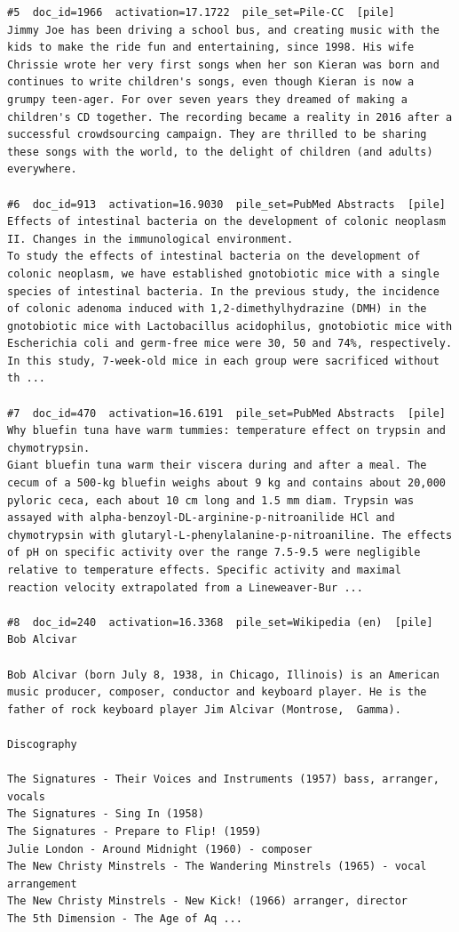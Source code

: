 \begin{verbatim}
#5  doc_id=1966  activation=17.1722  pile_set=Pile-CC  [pile]
Jimmy Joe has been driving a school bus, and creating music with the kids to make the ride fun and entertaining, since 1998. His wife Chrissie wrote her very first songs when her son Kieran was born and continues to write children's songs, even though Kieran is now a grumpy teen-ager. For over seven years they dreamed of making a children's CD together. The recording became a reality in 2016 after a successful crowdsourcing campaign. They are thrilled to be sharing these songs with the world, to the delight of children (and adults) everywhere.

#6  doc_id=913  activation=16.9030  pile_set=PubMed Abstracts  [pile]
Effects of intestinal bacteria on the development of colonic neoplasm II. Changes in the immunological environment.
To study the effects of intestinal bacteria on the development of colonic neoplasm, we have established gnotobiotic mice with a single species of intestinal bacteria. In the previous study, the incidence of colonic adenoma induced with 1,2-dimethylhydrazine (DMH) in the gnotobiotic mice with Lactobacillus acidophilus, gnotobiotic mice with Escherichia coli and germ-free mice were 30, 50 and 74%, respectively. In this study, 7-week-old mice in each group were sacrificed without th ...

#7  doc_id=470  activation=16.6191  pile_set=PubMed Abstracts  [pile]
Why bluefin tuna have warm tummies: temperature effect on trypsin and chymotrypsin.
Giant bluefin tuna warm their viscera during and after a meal. The cecum of a 500-kg bluefin weighs about 9 kg and contains about 20,000 pyloric ceca, each about 10 cm long and 1.5 mm diam. Trypsin was assayed with alpha-benzoyl-DL-arginine-p-nitroanilide HCl and chymotrypsin with glutaryl-L-phenylalanine-p-nitroaniline. The effects of pH on specific activity over the range 7.5-9.5 were negligible relative to temperature effects. Specific activity and maximal reaction velocity extrapolated from a Lineweaver-Bur ...

#8  doc_id=240  activation=16.3368  pile_set=Wikipedia (en)  [pile]
Bob Alcivar

Bob Alcivar (born July 8, 1938, in Chicago, Illinois) is an American music producer, composer, conductor and keyboard player. He is the father of rock keyboard player Jim Alcivar (Montrose,  Gamma).

Discography

The Signatures - Their Voices and Instruments (1957) bass, arranger, vocals
The Signatures - Sing In (1958)
The Signatures - Prepare to Flip! (1959)
Julie London - Around Midnight (1960) - composer
The New Christy Minstrels - The Wandering Minstrels (1965) - vocal arrangement
The New Christy Minstrels - New Kick! (1966) arranger, director
The 5th Dimension - The Age of Aq ...


\end{verbatim}
